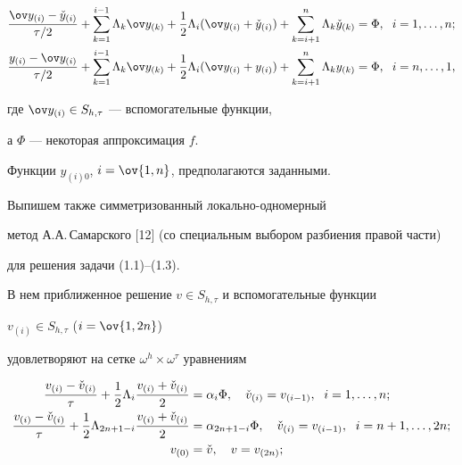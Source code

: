 \begin{equation}


\begin{split}


\frac{\ov y_{(i)}-\Check y_{(i)}}{\tau/2}+\sum_{k=1}^{i-1}\Lambda_k


\ov y_{(k)}+\frac{1}{2}\Lambda_i(\ov y_{(i)}+\Check y_{(i)})


+\sum_{k=i+1}^n\Lambda_k\Check y_{(k)}&=\Phi,\ \;


i=1,\dotsc,n;\\


\frac{y_{(i)}-\ov y_{(i)}}{\tau/2}+\sum_{k=1}^{i-1}\Lambda_k


\ov y_{(k)}+\frac{1}{2}\Lambda_i(\ov y_{(i)}+y_{(i)})


+\sum_{k=i+1}^n\Lambda_ky_{(k)}&=\Phi,\ \;


i=n,\dotsc,1,


\end{split}


\end{equation}


где $\ov y_{(i)}\in S_{h,\tau}$ --- вспомогательные функции,


а $\Phi$ --- некоторая аппроксимация $f$.


Функции $y_{(i)0}$, $i=\ov{1,n}$, предполагаются заданными.





Выпишем также симметризованный локально-одномерный 


метод А.А.\,Самарского [12] (со специальным выбором разбиения правой части) 


для решения задачи (1.1)--(1.3).


В нем приближенное решение $v\in S_{h,\tau}$ и вспомогательные функции


$v_{(i)}\in S_{h,\tau}$ ($i=\ov{1,2n}$)


удовлетворяют на сетке $\omega^h\times\omega^\tau$ уравнениям


\begin{equation}


\begin{split}


\frac{v_{(i)}-\Check v_{(i)}}{\tau}+\frac{1}{2}\Lambda_{i}


\frac{v_{(i)}+\Check v_{(i)}}{2}&=\alpha_{i}\Phi,\quad


\Check v_{(i)}=v_{(i-1)},\ \; i=1,\dotsc,n;\\


\frac{v_{(i)}-\Check v_{(i)}}{\tau}+\frac{1}{2}\Lambda_{2n+1-i}


\frac{v_{(i)}+\Check v_{(i)}}{2}&=\alpha_{2n+1-i}\Phi,\quad


\Check v_{(i)}=v_{(i-1)},\ \; i=n+1,\dotsc,2n;\\


v_{(0)}&=\Check v,\quad v=v_{(2n)};


\end{split}


\end{equation}



